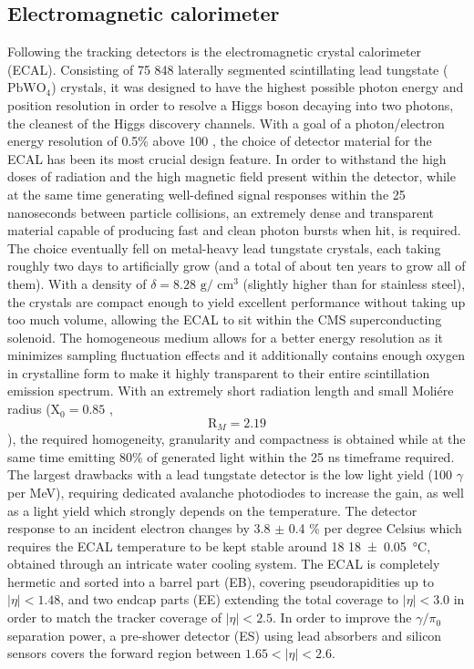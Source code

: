 \subsection{Electromagnetic calorimeter}
Following the tracking detectors is the electromagnetic crystal calorimeter (ECAL). Consisting of 75 848 laterally segmented scintillating lead tungstate ($\textrm{PbWO}_4$) crystals, it was designed to have the highest possible photon energy and position resolution in order to resolve a Higgs boson decaying into two photons, the cleanest of the Higgs discovery channels. 
With a goal of a photon/electron energy resolution of 0.5\% above 100 \GeV, the choice of detector material for the ECAL has been its most crucial design feature. 
In order to withstand the high doses of radiation and the high magnetic field present within the detector, while at the same time generating well-defined signal responses within the 25 nanoseconds between particle collisions, an extremely dense and transparent material capable of producing fast and clean photon bursts when hit, is required. 
The choice eventually fell on  metal-heavy lead tungstate crystals, each taking roughly two days to artificially grow (and a total of about ten years to grow all of them). With a density of $\delta=8.28 \textrm{ g}/\textrm{ cm}^3$ (slightly higher than for stainless steel), the crystals are compact enough to yield excellent performance without taking up too much volume, allowing the ECAL to sit within the CMS superconducting solenoid. The homogeneous medium allows for a better energy resolution as it minimizes sampling fluctuation effects and it additionally contains enough oxygen in crystalline form to make it highly transparent to their entire scintillation
emission spectrum. With an extremely short radiation length and small Moliére radius ($\textrm{X}_0=0.85$ \cm, $$\textrm{R}_M=2.19$$ \cm), the required homogeneity, granularity and compactness is obtained while at the same time emitting 80\% of generated light within the 25 ns timeframe required. The largest drawbacks with  a lead tungstate detector is the low light yield (100 $\gamma$ per MeV), requiring dedicated avalanche photodiodes to increase the gain, as well as a light yield which strongly depends on the temperature. The detector response to an
incident electron changes by 3.8 $\pm$ 0.4 \% per degree Celsius which requires the ECAL temperature to be kept stable around 18 \SI{18 \pm 0.05}{\degreeCelsius}, obtained through an intricate water cooling system.
The ECAL is completely hermetic and sorted into a barrel part (EB), covering pseudorapidities up to $|\eta|<1.48$, and two endcap parts (EE) extending the total coverage to $|\eta|<3.0$ in order to match the tracker coverage of $|\eta|<2.5$. In order to improve the $\gamma/\pi_0$ separation power, a pre-shower detector (ES) using lead absorbers and silicon sensors covers the forward region between $1.65<|\eta|<2.6$.
